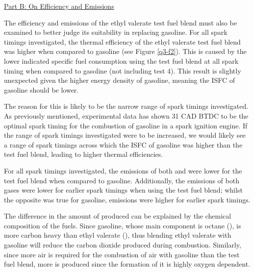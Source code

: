 \documentclass[11pt]{article}
\begin{document}
{\centering
  \underline{Part B: On Efficiency and Emissions}\par
}
The efficiency and emissions of the ethyl valerate test fuel blend must also be examined to better judge its suitability in replacing gasoline. For all spark timings investigated, the thermal efficiency of the ethyl valerate test fuel blend was higher when compared to gasoline (see Figure \ref{q3-f2}). This is caused by the lower indicated specific fuel consumption using the test fuel blend at all spark timing when compared to gasoline (not including test 4). This result is slightly unexpected given the higher energy density of gasoline, meaning the ISFC of gasoline should be lower.

The reason for this is likely to be the narrow range of spark timings investigated. As previously mentioned, experimental data has shown 31 CAD BTDC to be the optimal spark timing for the combustion of gasoline in a spark ignition engine. If the range of spark timings investigated were to be increased, we would likely see a range of spark timings across which the ISFC of gasoline was higher than the test fuel blend, leading to higher thermal efficiencies. 

For all spark timings investigated, the emissions of both  and  were lower for the test fuel blend when compared to gasoline. Additionally, the emissions of both gases were lower for earlier spark timings when using the test fuel blend; whilst the opposite was true for gasoline, emissions were higher for earlier spark timings.

The difference in the amount of  produced can be explained by the chemical composition of the fuels. Since gasoline, whose main component is octane (), is more carbon heavy than ethyl valerate (), thus blending ethyl valerate with gasoline will reduce the carbon dioxide produced during combustion. Similarly, since more air is required for the combustion of air with gasoline than the test fuel blend, more  is produced since the formation of it is highly oxygen dependent. 
\end{document}
